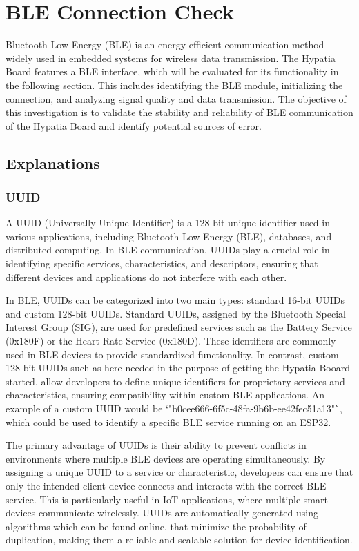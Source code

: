 %


\chapter{BLE Connection Check}
Bluetooth Low Energy (BLE) is an energy-efficient communication method widely used in embedded systems for wireless data transmission. The Hypatia Board features a BLE interface, which will be evaluated for its functionality in the following section. This includes identifying the BLE module, initializing the connection, and analyzing signal quality and data transmission. The objective of this investigation is to validate the stability and reliability of BLE communication of the Hypatia Board and identify potential sources of error. 

\section {Explanations}
\subsection{UUID}
A UUID (Universally Unique Identifier) is a 128-bit unique identifier used in various applications, including Bluetooth Low Energy (BLE), databases, and distributed computing. In BLE communication, UUIDs play a crucial role in identifying specific services, characteristics, and descriptors, ensuring that different devices and applications do not interfere with each other.  

In BLE, UUIDs can be categorized into two main types: standard 16-bit UUIDs and custom 128-bit UUIDs. Standard UUIDs, assigned by the Bluetooth Special Interest Group (SIG), are used for predefined services such as the Battery Service (0x180F) or the Heart Rate Service (0x180D). These identifiers are commonly used in BLE devices to provide standardized functionality. In contrast, custom 128-bit UUIDs such as here needed in the purpose of getting the Hypatia Booard started, allow developers to define unique identifiers for proprietary services and characteristics, ensuring compatibility within custom BLE applications. An example of a custom UUID would be `"b0cee666-6f5c-48fa-9b6b-ee42fec51a13"`, which could be used to identify a specific BLE service running on an ESP32.  

The primary advantage of UUIDs is their ability to prevent conflicts in environments where multiple BLE devices are operating simultaneously. By assigning a unique UUID to a service or characteristic, developers can ensure that only the intended client device connects and interacts with the correct BLE service. This is particularly useful in IoT applications, where multiple smart devices communicate wirelessly. UUIDs are automatically generated using algorithms which can be found online, that minimize the probability of duplication, making them a reliable and scalable solution for device identification.

